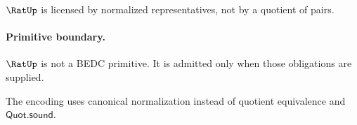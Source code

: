 \begin{corollary}
\label{cor:rat-licensed-not-primitive}
\(\RatUp\) is licensed by normalized representatives, not by a quotient of pairs.
\end{corollary}

\paragraph{Primitive boundary.}
\(\RatUp\) is not a BEDC primitive. It is admitted only when those obligations are supplied.

\begin{remark}
\label{rem:rat-zero-axiom-note}
The encoding uses canonical normalization instead of quotient equivalence and \(\mathsf{Quot.sound}\).
\end{remark}
